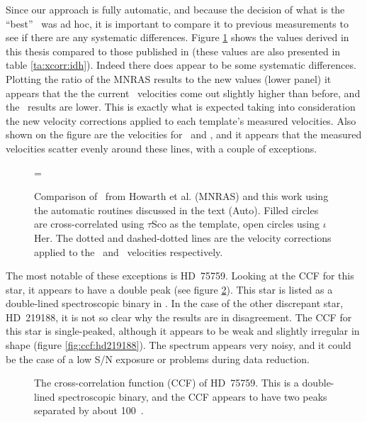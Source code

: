 Since our approach is fully automatic, and because the decision of
what is the ``best'' \vsini\ was ad hoc, it is important to compare it
to previous measurements to see if there are any systematic
differences. Figure \ref{fig:idhcomp} shows the values derived in this
thesis compared to those published in  (these values
are also presented in table \ref{ta:xcorr:idh}). Indeed there does
appear to be some systematic differences. Plotting the ratio of the
MNRAS results to the new values (lower panel) it appears that the the
current \tausco\ velocities come out slightly higher than before, and
the \iother\ results are lower. This is exactly what is expected
taking into consideration the new velocity corrections applied to each
template's measured velocities. Also shown on the figure are the
velocities for
\tausco\ and \iother, and it appears that the measured velocities
scatter evenly around these lines, with a couple of exceptions.

\begin{figure} %
\epsfxsize=\figwidth
\setlength{\cen}{(\textwidth / 2) - (\epsfxsize / 2)}
\hspace{\cen}
\caption[Comparison of \vsini\ from Howarth et al. (MNRAS) and this work]
{\fcfont Comparison of \vsini\ from Howarth et al. (MNRAS) and this
work using the automatic routines discussed in the text (Auto). Filled
circles are cross-correlated using $\tau$Sco as the template, open
circles using $\iota$Her. The dotted and dashed-dotted lines are the
velocity corrections applied to the \tausco\ and \iother\ velocities respectively.}
\label{fig:idhcomp}
\end{figure}   %

The most notable of these exceptions is HD~75759. Looking at the CCF
for this star, it appears to have a double peak (see figure
\ref{fig:ccf:hd75759}). This star is listed as a double-lined
spectroscopic binary in . In the case of the other
discrepant star, HD~219188, it is not so clear why the results are in
disagreement. The CCF for this star is single-peaked, although it
appears to be weak and slightly irregular in shape (figure
\ref{fig:ccf:hd219188}). The spectrum appears very noisy, and it could
be the case of a low S/N exposure or problems during data reduction.


\begin{figure} %
\epsfxsize=9cm
\setlength{\cen}{(\textwidth / 2) - (\epsfxsize / 2)}
\hspace{\cen}
\caption[The CCF of HD~75759]
{\fcfont The cross-correlation function (CCF) of HD~75759. This is a
double-lined spectroscopic binary, and the CCF appears to have
two peaks separated by about 100~\kms.}
\label{fig:ccf:hd75759}
\end{figure}   %


